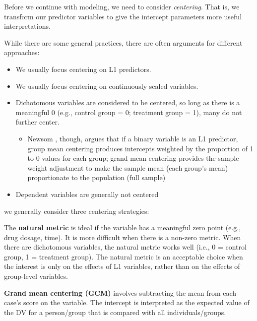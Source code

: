 \documentclass[
  11pt,
]{book}
\providecommand{\tightlist}{%
  \setlength{\itemsep}{0pt}\setlength{\parskip}{0pt}}
\begin{document}
Before we continue with modeling, we need to consider \emph{centering}. That is, we transform our predictor variables to give the intercept parameters more useful interpretations.

While there are some general practices, there are often arguments for different approaches:

\begin{itemize}
\tightlist
\item
  We usually focus centering on L1 predictors.
\item
  We usually focus centering on continuously scaled variables.
\item
  Dichotomous variables are considered to be centered, so long as there is a meaningful 0 (e.g., control group = 0; treatment group = 1), many do not further center.

  \begin{itemize}
  \tightlist
  \item
    Newsom \citeyearpar{newsom_centering_2019}, though, argues that if a binary variable is an L1 predictor, group mean centering produces intercepts weighted by the proportion of 1 to 0 values for each group; grand mean centering provides the sample weight adjustment to make the sample mean (each group's mean) proportionate to the population (full sample)
  \end{itemize}
\item
  Dependent variables are generally not centered
\end{itemize}

we generally consider three centering strategies:

The \textbf{natural metric} is ideal if the variable has a meaningful zero point (e.g., drug dosage, time). It is more difficult when there is a non-zero metric. When there are dichotomous variables, the natural metric works well (i.e., 0 = control group, 1 = treatment group). The natural metric is an acceptable choice when the interest is only on the effects of L1 variables, rather than on the effects of group-level variables.

\textbf{Grand mean centering (GCM)} involves subtracting the mean from each case's score on the variable. The intercept is interpreted as the expected value of the DV for a person/group that is compared with all individuals/groups.
\end{document}
